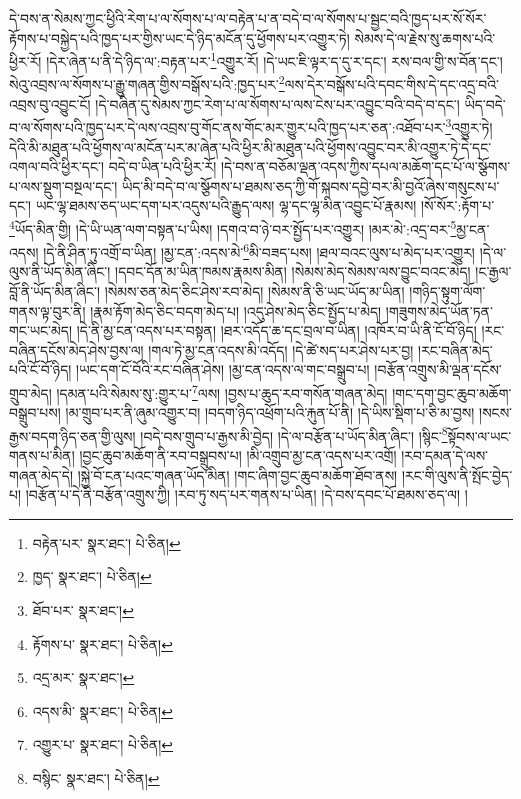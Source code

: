 དེ་བས་ན་སེམས་ཀྱང་ཕྱིའི་རེག་པ་ལ་སོགས་པ་ལ་བརྟེན་པ་ན་བདེ་བ་ལ་སོགས་པ་སྦྱང་བའི་ཁྱད་པར་སོ་སོར་རྟོགས་པ་བསྐྱེད་པའི་ཁྱད་པར་གྱིས་ཡང་དེ་ཉིད་མངོན་དུ་ཕྱོགས་པར་འགྱུར་ཏེ། སེམས་དེ་ལ་རྗེས་སུ་ཆགས་པའི་ཕྱིར་རོ། །དེར་ཞེན་པ་ནི་དེ་ཉིད་ལ་:བརྟན་པར་\footnote{བརྟེན་པར་  སྣར་ཐང་།  པེ་ཅིན། }འགྱུར་རོ། །དེ་ཡང་ཇི་ལྟར་ད་དུ་ར་དང་། རས་བལ་གྱི་ས་བོན་དང་། སེའུ་འབྲས་ལ་སོགས་པ་རྒྱུ་གཞན་གྱིས་བསྒོས་པའི་:ཁྱད་པར་\footnote{ཁྱད་  སྣར་ཐང་།  པེ་ཅིན། }ལས་དེར་བསྒོས་པའི་དབང་གིས་དེ་དང་འདྲ་བའི་འབྲས་བུ་འབྱུང་ངོ། །དེ་བཞིན་དུ་སེམས་ཀྱང་རེག་པ་ལ་སོགས་པ་ལས་ངེས་པར་འབྱུང་བའི་བདེ་བ་དང་། ཡིད་བདེ་བ་ལ་སོགས་པའི་ཁྱད་པར་དེ་ལས་འབྲས་བུ་གོང་ནས་གོང་མར་གྱུར་པའི་ཁྱད་པར་ཅན་:འཐོབ་པར་\footnote{ཐོབ་པར་  སྣར་ཐང་། }འགྱུར་ཏེ། དེའི་མི་མཐུན་པའི་ཕྱོགས་ལ་མངོན་པར་མ་ཞེན་པའི་ཕྱིར་མི་མཐུན་པའི་ཕྱོགས་འབྱུང་བར་མི་འགྱུར་ཏེ་དེ་དང་འགལ་བའི་ཕྱིར་དང་། བདེ་བ་ཡིན་པའི་ཕྱིར་རོ། །དེ་བས་ན་བཅོམ་ལྡན་འདས་ཀྱིས་དཔལ་མཆོག་དང་པོ་ལ་སྩོགས་པ་ལས་སྡུག་བསྔལ་དང་། ཡིད་མི་བདེ་བ་ལ་སྩོགས་པ་ཐམས་ཅད་ཀྱི་གོ་སྐབས་དབྱེ་བར་མི་བྱའོ་ཞེས་གསུངས་པ་དང་། ཡང་ལྷ་ཐམས་ཅད་ཡང་དག་པར་འདུས་པའི་རྒྱུད་ལས། ལྷ་དང་ལྷ་མིན་འབྱུང་པོ་རྣམས། །སོ་སོར་:རྟོག་པ་\footnote{རྟོགས་པ་  སྣར་ཐང་།  པེ་ཅིན། }ཡོད་མིན་གྱི། །དེ་ཡི་ཡན་ལག་བསྟན་པ་ཡིས། །དགའ་བ་ཉེ་བར་སྤྱོད་པར་འགྱུར། །མར་མེ་:འདྲ་བར་\footnote{འདྲ་མར་  སྣར་ཐང་། }མྱ་ངན་འདས། །དེ་ནི་ཤིན་ཏུ་འགྲོ་བ་ཡིན། །མྱ་ངན་:འདས་མེ་\footnote{འདས་མི་  སྣར་ཐང་།  པེ་ཅིན། }མི་བཟད་པས། །ཐལ་བའང་ལུས་པ་མེད་པར་འགྱུར། །དེ་ལ་ལུས་ནི་ཡོད་མིན་ཞིང་། །དབང་དོན་མ་ཡིན་ཁམས་རྣམས་མིན། །སེམས་མེད་སེམས་ལས་བྱུང་བའང་མེད། །ང་རྒྱལ་བློ་ནི་ཡོད་མིན་ཞིང་། །སེམས་ཅན་མེད་ཅིང་ཤེས་རབ་མེད། །སེམས་ནི་ཅི་ཡང་ཡོད་མ་ཡིན། །གཉིད་སྟུག་ལོག་གནས་ལྟ་བུར་ནི། །རྣམ་རྟོག་མེད་ཅིང་བདག་མེད་པ། །འདུ་ཤེས་མེད་ཅིང་སྤྱོད་པ་མེད། །གཟུགས་མེད་ཡོན་ཏན་གང་ཡང་མེད། །དེ་ནི་མྱ་ངན་འདས་པར་བསྟན། །ཐར་འདོད་ཆ་དང་བྲལ་བ་ཡིན། །འཁོར་བ་ཡི་ནི་ངོ་བོ་ཉིད། །རང་བཞིན་དངོས་མེད་ཤེས་བྱས་ལ། །གལ་ཏེ་མྱ་ངན་འདས་མི་འདོད། །དེ་ཚེ་སད་པར་ཤེས་པར་བྱ། །རང་བཞིན་མེད་པའི་ངོ་བོ་ཉིད། །ཡང་དག་ངོ་བོའི་རང་བཞིན་ཤེས། །མྱ་ངན་འདས་ལ་གང་བསྒྲུབ་པ། །བརྩོན་འགྲུས་མི་ལྡན་དངོས་གྲུབ་མེད། །དམན་པའི་སེམས་སུ་:གྱུར་པ་\footnote{འགྱུར་པ་  སྣར་ཐང་།  པེ་ཅིན། }ལས། །བྱས་པ་ཆུད་རབ་གསོན་གཞན་མེད། །གང་དག་བྱང་ཆུབ་མཆོག་བསྒྲུབ་པས། །མ་གྲུབ་པར་ནི་ཞུམ་འགྱུར་བ། །བདག་ཉིད་འཕྲོག་པའི་རྐུན་པོ་ནི། །དེ་ཡིས་སྡིག་པ་ཅི་མ་བྱས། །སངས་རྒྱས་བདག་ཉིད་ཅན་གྱི་ལུས། །བདེ་བས་གྲུབ་པ་རྒྱས་མི་བྱེད། །དེ་ལ་བརྩོན་པ་ཡོད་མིན་ཞིང་། །སྙིང་\footnote{བསྙིང་  སྣར་ཐང་།  པེ་ཅིན། }སྟོབས་ལ་ཡང་གནས་པ་མིན། །བྱང་ཆུབ་མཆོག་ནི་རབ་བསྒྲུབས་པ། །མི་འགྲུབ་མྱ་ངན་འདས་པར་འགྲོ། །རབ་དམན་དེ་ལས་གཞན་མེད་དེ། །སྐྱེ་བོ་ངན་པའང་གཞན་ཡོད་མིན། །གང་ཞིག་བྱང་ཆུབ་མཆོག་ཐོབ་ནས། །རང་གི་ལུས་ནི་སྤོང་བྱེད་པ། །བརྩོན་པ་དེ་ནི་བརྩོན་འགྲུས་ཀྱི། །རབ་ཏུ་སད་པར་གནས་པ་ཡིན། །དེ་བས་དབང་པོ་ཐམས་ཅད་ལ། །
